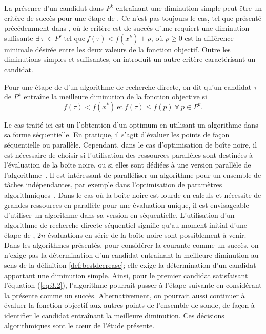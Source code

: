 La présence d'un candidat dans $P^k$ entraînant une diminution simple peut être un critère de succès pour une étape de \POLL. Ce n'est pas toujours le cas, tel que présenté précédemment dans \GSS, où le critère est de succès d'une \POLL requiert une diminution suffisante $\exists~\tau~\in P^k ~\text{tel que} ~ f(\tau) < f(x^k) + \rho$, où $\rho \geq 0$ est la différence minimale désirée entre les deux valeurs de la fonction objectif. Outre les diminutions simples et suffisantes, on introduit un autre critère caractérisant un candidat.
\begin{definition}\label{def:bestdecrease}
	Pour une étape de \POLL d'un algorithme de recherche directe, on dit qu'un candidat $\tau$ de $P^k$ entraîne la meilleure diminution de la fonction objective si 
	\begin{equation*}
	f(\tau) < f(x^*)~\text{et}~f(\tau) \leq f(p)~ \forall~ p \in P^k.
	\end{equation*}
\end{definition}
Le cas traité ici est un l'obtention d'un optimum en utilisant un algorithme dans sa forme séquentielle. En pratique, il s'agit d'évaluer les points de façon séquentielle ou parallèle. Cependant, dans le cas d'optimisation de boîte noire, il est nécessaire de choisir si l'utilisation des ressources parallèles sont destinées à l'évaluation de la boîte noire, ou si elles sont dédiées à une version parallèle de l'algorithme~\cite{HoKoTo01a,AuDeLe08}. Il est intéressant de paralléliser un algorithme pour un ensemble de tâches indépendantes, par exemple dans l'optimisation de paramètres algorithmiques~\cite{AuDaOr13a}. Dans le cas où la boite noire est lourde en calculs et nécessite de grandes ressources en parallèle pour une évaluation unique, il est envisageable d'utiliser un algorithme dans sa version en séquentielle. L'utilisation d'un algorithme de recherche directe séquentiel signifie qu'au moment initial d'une étape de \POLL, $2n$ évaluations en série de la boîte noire sont possiblement à venir. Dans les algorithmes présentés, pour considérer la \POLL courante comme un succès, on n'exige pas la détermination d'un candidat entrainant la meilleure diminution au sens de la définition \ref{def:bestdecrease}; elle exige la détermination d'un candidat apportant une diminution simple. Ainsi, pour le premier candidat satisfaisant l'équation (\ref{eq:3.2}), l'algorithme pourrait passer à l'étape suivante en considérant la présente comme un succès. Alternativement, on pourrait aussi continuer à évaluer la fonction objectif aux autres points de l'ensemble de sonde, de façon à identifier le candidat entraînant la meilleure diminution. Ces décisions algorithmiques sont le cœur de l'étude présente. 
